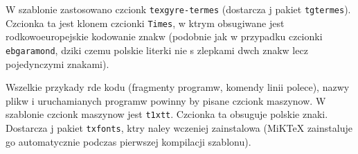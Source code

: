 W szablonie zastosowano czcionk \texttt{texgyre-termes} (dostarcza j pakiet \texttt{tgtermes}). Czcionka ta jest klonem czcionki \texttt{Times}, w ktrym obsugiwane jest rodkowoeuropejskie kodowanie znakw (podobnie jak w przypadku czcionki \texttt{ebgaramond}, dziki czemu polskie literki nie s zlepkami dwch znakw lecz pojedynczymi znakami).  

Wszelkie przykady rde kodu (fragmenty programw, komendy linii polece), nazwy plikw i uruchamianych programw powinny by pisane czcionk maszynow. W szablonie czcionk maszynow jest \texttt{t1xtt}. Czcionka ta obsuguje polskie znaki. Dostarcza j pakiet \texttt{txfonts}, ktry naley wczeniej zainstalowa (MiKTeX zainstaluje go automatycznie podczas pierwszej kompilacji szablonu).   



